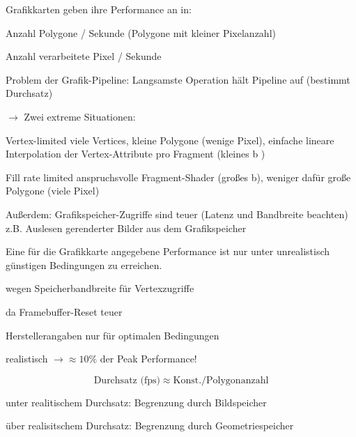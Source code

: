 \documentclass[landscape]{article}
\makeatletter
\renewcommand{\subsection}{\@startsection{subsection}{2}{0mm}%
                                {-1explus -.5ex minus -.2ex}%
                                {0.5ex plus .2ex}%
                                {\normalfont\normalsize\bfseries}}
\makeatother
\begin{document}
\begin{multicols}{3}
  \begin{itemize*}
    \item Grafikkarten geben ihre Performance an in:
    \begin{itemize*}
      \item Anzahl Polygone / Sekunde (Polygone mit kleiner Pixelanzahl)
      \item Anzahl verarbeitete Pixel / Sekunde
    \end{itemize*}
    \item Problem der Grafik-Pipeline: Langsamste Operation hält Pipeline auf (bestimmt Durchsatz) 
    \item $\rightarrow$ Zwei extreme Situationen:
    \begin{description*}
      \item[Vertex-limited] viele Vertices, kleine Polygone (wenige Pixel), einfache lineare Interpolation der Vertex-Attribute pro Fragment (kleines b )
      \item[Fill rate limited] anspruchsvolle Fragment-Shader (großes b), weniger dafür große Polygone (viele Pixel)
    \end{description*}
    \item Außerdem: Grafikspeicher-Zugriffe sind teuer (Latenz und Bandbreite beachten) z.B. Auslesen gerenderter Bilder aus dem Grafikspeicher
    \item Eine für die Grafikkarte angegebene Performance ist nur unter unrealistisch günstigen Bedingungen zu erreichen.
    \begin{itemize*}
      \item wegen Speicherbandbreite für Vertexzugriffe
      \item da Framebuffer-Reset teuer
      \item Herstellerangaben nur für optimalen Bedingungen
      \item realistisch $\rightarrow\approx 10\%$ der Peak Performance!
    \end{itemize*}
  \end{itemize*}
  
  $$\text{Durchsatz (fps)} \approx \text{Konst.} / \text{Polygonanzahl}$$
  \begin{itemize*}
    \item unter realitischem Durchsatz: Begrenzung durch Bildspeicher
    \item über realisitschem Durchsatz: Begrenzung durch Geometriespeicher
  \end{itemize*}
  
  
\end{multicols}
\end{document}
